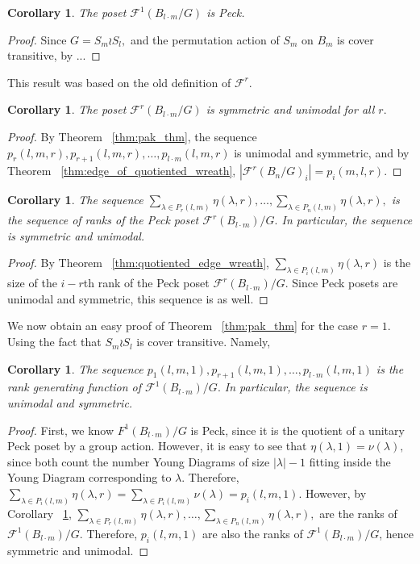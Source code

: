 \documentclass{amsart}
\newtheorem{cor}[thm]{Corollary}
\theoremstyle{remark}
\begin{document}
\begin{cor}
\label{cor:peck_wreath_1}
The poset $\mathcal F^1(B_{l\cdot m}/G)$ is Peck.
\end{cor}
\begin{proof}
Since $G = S_m \wr S_l,$ and the permutation action of $S_m$ on $B_m$ is cover transitive, by ...
\end{proof}

This result was based on the old definition of $\mathcal F^r.$

\begin{cor}
The poset $\mathcal F^r(B_{l\cdot m}/G)$ is symmetric and unimodal for all $r.$
\end{cor}
\begin{proof}
By Theorem ~\ref{thm:pak_thm}, the sequence $p_r(l,m,r), p_{r+1}(l,m,r),\ldots, p_{l\cdot m}(l,m,r)$ is unimodal and symmetric, and by Theorem ~\ref{thm:edge_of_quotiented_wreath}, $|\mathcal F^r(B_n/G)_i| = p_i(m,l,r).$
\end{proof}

\fi

\begin{cor}
\label{cor:unimodal_wreath_r_sequence}
The sequence $\sum_{\lambda \in P_r(l,m)} \eta(\lambda,r),\ldots,\sum_{\lambda \in P_n(l,m)} \eta(\lambda,r),$ is the sequence of ranks of the Peck poset $\mathcal F^r(B_{l\cdot m})/G.$ In particular, the sequence is symmetric and unimodal.
\end{cor}
\begin{proof}
By Theorem ~\ref{thm:quotiented_edge_wreath}, $\sum_{\lambda \in P_i(l,m)} \eta(\lambda,r)$ is the size of the $i-r$th rank of the Peck poset $\mathcal F^r(B_{l\cdot m})/G.$ Since Peck posets are unimodal and symmetric, this sequence is as well.
\end{proof}

We now obtain an easy proof of Theorem ~\ref{thm:pak_thm} for the case $r = 1.$ Using the fact that $S_m\wr S_l$ is cover transitive. Namely,

\begin{cor}
\label{cor:rank_gen_fn_wreath_1}
The sequence $p_1(l,m,1), p_{r+1}(l,m,1),\ldots, p_{l\cdot m}(l,m,1)$ is the rank generating function of $\mathcal F^1(B_{l\cdot m})/G.$ In particular, the sequence is unimodal and symmetric.
\end{cor}
\begin{proof}
First, we know $F^1(B_{l\cdot m})/G$ is Peck, since it is the quotient of a unitary Peck poset by a group action. However, it is easy to see that $\eta(\lambda,1) = \nu(\lambda),$ since both count the number Young Diagrams of size $|\lambda|-1$ fitting inside the Young Diagram corresponding to $\lambda.$ Therefore, $\sum_{\lambda \in P_i(l,m)} \eta(\lambda,r) = \sum_{\lambda \in P_i(l,m)}\nu(\lambda) = p_i(l,m,1).$ However, by Corollary ~\ref{cor:unimodal_wreath_r_sequence}, $\sum_{\lambda \in P_r(l,m)} \eta(\lambda,r),\ldots,\sum_{\lambda \in P_n(l,m)} \eta(\lambda,r),$ are the ranks of $\mathcal F^1(B_{l\cdot m})/G.$ Therefore, $p_i(l,m,1)$ are also the ranks of $\mathcal F^1(B_{l\cdot m})/G$, hence symmetric and unimodal.
\end{proof}
\end{document}
